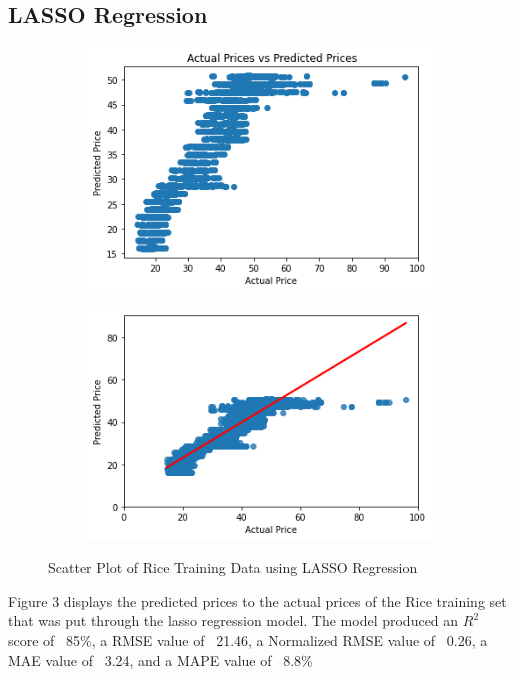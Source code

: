 \documentclass[runningheads]{llncs}
\begin{document}
\subsection{LASSO Regression}
\begin{figure}
	\begin{subfigure}{.5\textwidth}
		\centering
		\includegraphics[width=.8\linewidth]{FIGURES/lass_train1.png}
		
	\end{subfigure}%
	\begin{subfigure}{.5\textwidth}
		\centering
		\includegraphics[width=.8\linewidth]{FIGURES/lass_train2.png}
		
	\end{subfigure}
	\caption{Scatter Plot of Rice Training Data using LASSO Regression}
\end{figure}

Figure 3 displays the predicted prices to the actual prices of the Rice training set that was put through the lasso regression model. The model produced an $R^2$ score of ~85\%, a RMSE value of ~21.46, a Normalized RMSE value of ~0.26, a MAE value of ~3.24, and a MAPE value of ~8.8\%
\end{document}
